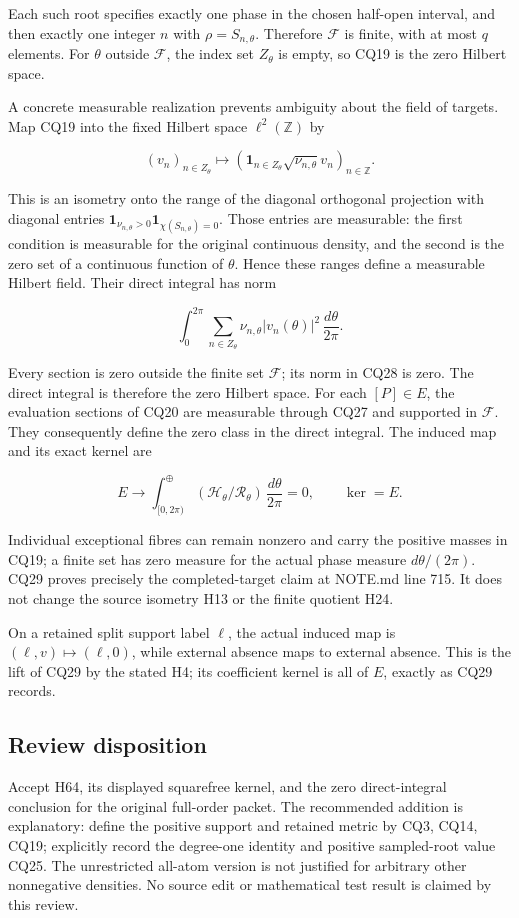\documentclass{article}
\begin{document}
Each such root specifies exactly one phase in the chosen half-open interval, and then exactly one integer \(n\) with \(\rho=S_{n,\theta}\). Therefore \(\mathcal F\) is finite, with at most \(q\) elements. For \(\theta\) outside \(\mathcal F\), the index set \(Z_\theta\) is empty, so CQ19 is the zero Hilbert space.

A concrete measurable realization prevents ambiguity about the field of targets. Map CQ19 into the fixed Hilbert space \(\ell^2(\mathbb Z)\) by

\[
(v_n)_{n\in Z_\theta}\longmapsto
\left(\mathbf1_{n\in Z_\theta}\sqrt{\nu_{n,\theta}}v_n\right)_{n\in\mathbb Z}.
\tag{CQ27}
\]

This is an isometry onto the range of the diagonal orthogonal projection with diagonal entries \(\mathbf1_{\nu_{n,\theta}>0} \mathbf1_{\chi(S_{n,\theta})=0}\). Those entries are measurable: the first condition is measurable for the original continuous density, and the second is the zero set of a continuous function of \(\theta\). Hence these ranges define a measurable Hilbert field. Their direct integral has norm

\[
\int_0^{2\pi}\sum_{n\in Z_\theta}
\nu_{n,\theta}|v_n(\theta)|^2\,\frac{d\theta}{2\pi}.
\tag{CQ28}
\]

Every section is zero outside the finite set \(\mathcal F\); its norm in CQ28 is zero. The direct integral is therefore the zero Hilbert space. For each \([P] \in E\), the evaluation sections of CQ20 are measurable through CQ27 and supported in \(\mathcal F\). They consequently define the zero class in the direct integral. The induced map and its exact kernel are

\[
E\longrightarrow
\int_{[0,2\pi)}^\oplus
(\mathcal H_\theta/\mathcal R_\theta)\,\frac{d\theta}{2\pi}
=0,
\qquad \ker=E.
\tag{CQ29}
\]

Individual exceptional fibres can remain nonzero and carry the positive masses in CQ19; a finite set has zero measure for the actual phase measure \(d\theta/(2 \pi)\). CQ29 proves precisely the completed-target claim at NOTE.md line 715. It does not change the source isometry H13 or the finite quotient H24.

On a retained split support label \(\ell\), the actual induced map is \((\ell,v) \longmapsto (\ell,0)\), while external absence maps to external absence. This is the lift of CQ29 by the stated H4; its coefficient kernel is all of \(E\), exactly as CQ29 records.

\subsection{Review disposition}\label{review-disposition}

Accept H64, its displayed squarefree kernel, and the zero direct-integral conclusion for the original full-order packet. The recommended addition is explanatory: define the positive support and retained metric by CQ3, CQ14, CQ19; explicitly record the degree-one identity and positive sampled-root value CQ25. The unrestricted all-atom version is not justified for arbitrary other nonnegative densities. No source edit or mathematical test result is claimed by this review.
\end{document}
